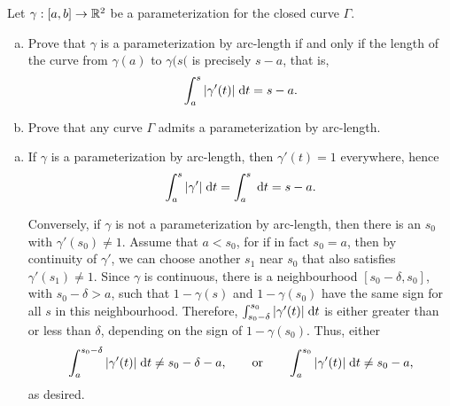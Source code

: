 \begin{exrc}[1]
    Let \(\gamma: [a, b] \to \mathbb{R}^2\) be a parameterization for the closed curve \(\Gamma\).
    \begin{enumerate}[(a)]
    \item
        Prove that \(\gamma\) is a parameterization by arc-length if and only if the length
        of the curve from \(\gamma(a)\) to \(\gamma(s(\) is precisely \(s - a\), that is,
        \begin{equation*}
            \int_{a}^{s} |\gamma'(t)| \;\mathrm d t = s - a.
        \end{equation*}

    \item
        Prove that any curve \(\Gamma\) admits a parameterization by arc-length.
    \end{enumerate}

\begin{soln}
    \begin{enumerate}[(a)]
    \item
        If \(\gamma\) is a parameterization by arc-length,
        then \(\gamma'(t) = 1\) everywhere,
        hence
        \begin{equation*}
            \int_{a}^{s} |\gamma'| \;\mathrm d t
            = \int_{a}^{s}  \;\mathrm d t
            = s - a.
        \end{equation*}

        Conversely, if \(\gamma\) is not a parameterization by arc-length,
        then there is an \(s_0\) with \(\gamma'(s_0) \neq 1\).
        Assume that \(a < s_0\),
        for if in fact \(s_0 = a\), then by continuity of \(\gamma'\),
        we can choose another \(s_1\) near \(s_0\) that also satisfies \(\gamma'(s_1) \neq 1\).
        Since \(\gamma\) is continuous, there is a neighbourhood \([s_0 - \delta, s_0]\),
        with \(s_0 - \delta > a\),
        such that \(1 - \gamma(s)\) and \(1 - \gamma(s_0)\) have the same sign
        for all \(s\) in this neighbourhood.
        Therefore, \(\int_{s_0 - \delta}^{s_0} |\gamma'(t)| \;\mathrm d t\)
        is either greater than or less than \(\delta\),
        depending on the sign of \(1 - \gamma(s_0)\).
        Thus, either
        \begin{equation*}
            \int_{a}^{s_0 - \delta} |\gamma'(t)| \;\mathrm d t \neq s_0 - \delta - a,
            \qquad \text{or} \qquad
            \int_{a}^{s_0} |\gamma'(t)| \;\mathrm d t \neq s_0 - a,
        \end{equation*}
        as desired.


\end{enumerate}
\end{soln}
\end{exrc}
